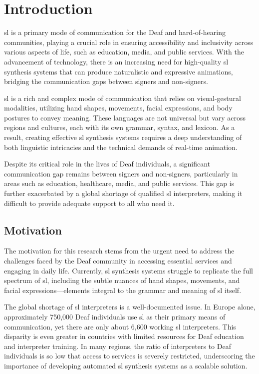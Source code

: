 \documentclass[../../main.tex]{subfiles}
\begin{document}
\chapter{Introduction}
\label{ch:introduction}

\gls{sl} is a primary mode of communication for the Deaf and hard-of-hearing communities, playing a crucial role in ensuring accessibility and inclusivity across various aspects of life, such as education, media, and public services. With the advancement of technology, there is an increasing need for high-quality \gls{sl} synthesis systems that can produce naturalistic and expressive animations, bridging the communication gaps between signers and non-signers.

\gls{sl} is a rich and complex mode of communication that relies on visual-gestural modalities, utilizing hand shapes, movements, facial expressions, and body postures to convey meaning. These languages are not universal but vary across regions and cultures, each with its own grammar, syntax, and lexicon. As a result, creating effective \gls{sl} synthesis systems requires a deep understanding of both linguistic intricacies and the technical demands of real-time animation.

Despite its critical role in the lives of Deaf individuals, a significant communication gap remains between signers and non-signers, particularly in areas such as education, healthcare, media, and public services. This gap is further exacerbated by a global shortage of qualified \gls{sl} interpreters, making it difficult to provide adequate support to all who need it.

\section{Motivation}
\label{ch:introduction:motivation}

The motivation for this research stems from the urgent need to address the challenges faced by the Deaf community in accessing essential services and engaging in daily life. Currently, \gls{sl} synthesis systems struggle to replicate the full spectrum of \gls{sl}, including the subtle nuances of hand shapes, movements, and facial expressions—elements integral to the grammar and meaning of \gls{sl} itself.

The global shortage of \gls{sl} interpreters is a well-documented issue. In Europe alone, approximately 750,000 Deaf individuals use \gls{sl} as their primary means of communication, yet there are only about 6,600 working \gls{sl} interpreters. This disparity is even greater in countries with limited resources for Deaf education and interpreter training. In many regions, the ratio of interpreters to Deaf individuals is so low that access to services is severely restricted, underscoring the importance of developing automated \gls{sl} synthesis systems as a scalable solution.
\end{document}
